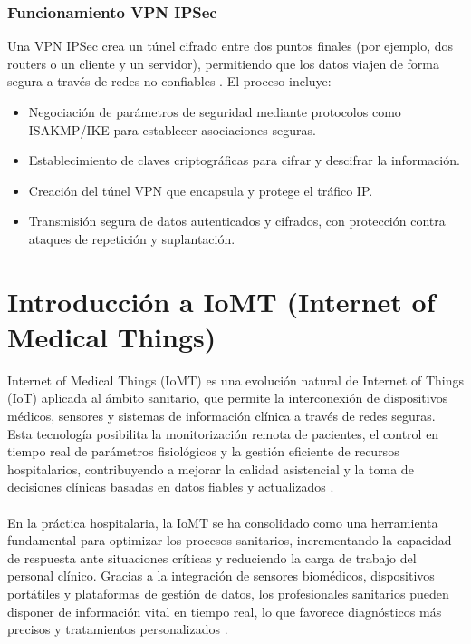 \subsubsection{Funcionamiento VPN IPSec}
Una VPN IPSec crea un túnel cifrado entre dos puntos finales (por ejemplo, dos routers o un cliente y un servidor), permitiendo que los datos viajen de forma segura a través de redes 
no confiables \cite{ipsec}. El proceso incluye:
\begin{itemize}
    \item Negociación de parámetros de seguridad mediante protocolos como ISAKMP/IKE para establecer asociaciones seguras.
    \item Establecimiento de claves criptográficas para cifrar y descifrar la información.
    \item Creación del túnel VPN que encapsula y protege el tráfico IP.
    \item Transmisión segura de datos autenticados y cifrados, con protección contra ataques de repetición y suplantación.
\end{itemize}

\section{Introducción a IoMT (Internet of Medical Things)}
Internet of Medical Things (IoMT) es una evolución natural de Internet of Things (IoT) aplicada al ámbito sanitario, que permite la interconexión de dispositivos médicos, 
sensores y sistemas de información clínica a través de redes seguras. Esta tecnología posibilita la monitorización remota de pacientes, el control en tiempo real de 
parámetros fisiológicos y la gestión eficiente de recursos hospitalarios, contribuyendo a mejorar la calidad asistencial y la toma de decisiones clínicas basadas en datos 
fiables y actualizados \cite{articulo2} \cite{articulo3}. \\ \\

En la práctica hospitalaria, la \ac{IoMT} se ha consolidado como una herramienta fundamental para optimizar los procesos sanitarios, incrementando la capacidad de respuesta ante situaciones
críticas y reduciendo la carga de trabajo del personal clínico. Gracias a la integración de sensores biomédicos, dispositivos portátiles y plataformas de gestión de datos, 
los profesionales sanitarios pueden disponer de información vital en tiempo real, lo que favorece diagnósticos más precisos y tratamientos personalizados \cite{articulo3}. \\ \\

